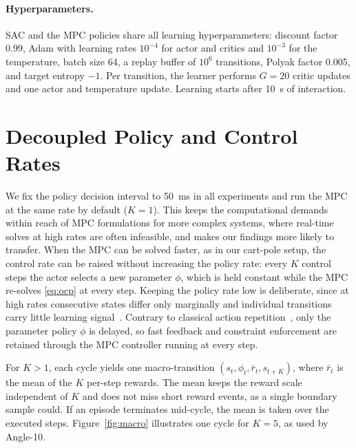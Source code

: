 \documentclass{l4dc2027}
\let\cite\citep
\newcommand{\zopangleten}{Angle-10\xspace}
\begin{document}
\paragraph{Hyperparameters.} SAC and the MPC policies share all learning
hyperparameters: discount factor 0.99, Adam with learning rates $10^{-4}$ for
actor and critics and $10^{-3}$ for the temperature, batch size 64, a replay
buffer of $10^6$ transitions, Polyak factor 0.005, and target entropy $-1$.
{\color{magenta}Per transition, the learner performs $G=20$ critic updates and one actor and
temperature update.} Learning starts after 10~s of interaction.

\section{Decoupled Policy and Control Rates}
\label{app:macro}
\label{sec:rates}
We fix the policy decision interval to 50~ms in all experiments and run the MPC at the same rate by default ($K = 1$). This keeps the computational demands within reach of MPC formulations for more complex systems, where real-time solves at high rates are often infeasible, and makes our findings more likely to transfer. When the MPC can be solved faster, as in our cart-pole setup, the control rate can be raised without increasing the policy rate: every $K$ control steps the actor selects a new parameter $\phi$, which is held constant while the MPC re-solves \eqref{eq:ocp} at
every step. Keeping the policy rate low is deliberate, since at high rates consecutive states differ only marginally and individual transitions carry little learning signal~\cite{sharma2017figar,metelli2020persistence}. Contrary to classical action repetition~\cite{mnih2015dqn,sharma2017figar}, only the parameter policy $\phi$ is delayed, so fast feedback and constraint enforcement are retained through the MPC controller running at every step.

For $K > 1$, each cycle yields one macro-transition
$(s_t, \phi_t, \bar{r}_t, s_{t+K})$, where $\bar{r}_t$ is the mean of the $K$ per-step rewards. The mean keeps the reward scale independent of $K$ and does not miss short reward events, as a single boundary sample could. If
an episode terminates mid-cycle, the mean is taken over the executed steps. Figure~\ref{fig:macro} illustrates one cycle for $K=5$, as used
by \zopangleten.
\end{document}
